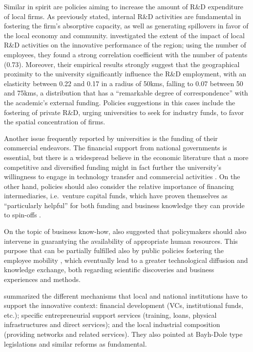 Similar in spirit are policies aiming to increase the amount of R\&D expenditure of local firms. As previously stated, internal R\&D activities are fundamental in fostering the firm's absorptive capacity, as well as generating spillovers in favor of the local economy and community. \citet{Fritsch2007} investigated the extent of the impact of local R\&D activities on the innovative performance of the region; using the number of employees, they found a strong correlation coefficient with the number of patents (0.73). Moreover, their empirical results strongly suggest that the geographical proximity to the university significantly influence the R\&D employment, with an elasticity between 0.22 and 0.17 in a radius of 50kms, falling to 0.07 between 50 and 75kms, a distribution that has a \enquote{remarkable degree of correspondence} with the academic's external funding. Policies suggestions in this cases include the fostering of private R\&D, urging universities to seek for industry funds, to favor the spatial concentration of firms. 

Another issue frequently reported by universities is the funding of their commercial endeavors. The financial support from national governments is essential, but there is a widespread believe in the economic literature that a more competitive and diversified funding might in fact further the university's willingness to engage in technology transfer and commercial activities \citep{Rasmussen2006}. On the other hand, policies should also consider the relative importance of financing intermediaries, i.e.\ venture capital funds, which have proven themselves as \enquote{particularly helpful} for both funding and business knowledge they can provide to spin-offs \citep{Yusuf2008}.

On the topic of business know-how, \citet{Chapple2005} also suggested that policymakers should also intervene in guarantying the availability of appropriate human resources. This purpose that can be partially fulfilled also by public policies fostering the employee mobility \citep{Franco2000}, which eventually lead to a greater technological diffusion and knowledge exchange, both regarding scientific discoveries and business experiences and methods. 

\citet{Fini2009} summarized the different mechanisms that local and national institutions have to support the innovative context: financial development (VCs, institutional funds, etc.); specific entrepreneurial support services (training, loans, physical infrastructures and direct services); and the local industrial composition (providing networks and related services). They also pointed at Bayh-Dole type legislations and similar reforms as fundamental. 

